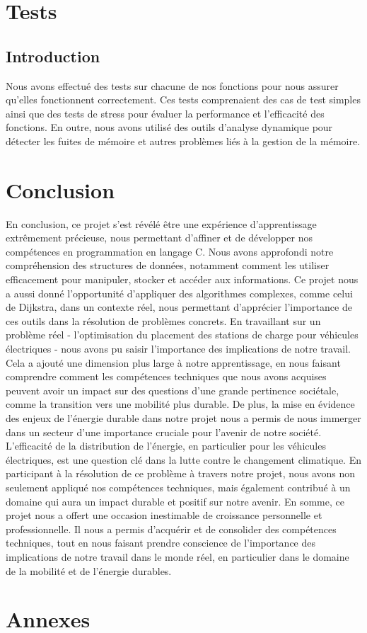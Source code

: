 \documentclass[french,a4paper]{article}
\begin{document}
\section{Tests}

\subsection{Introduction}
Nous avons effectué des tests sur chacune de nos fonctions pour nous assurer qu'elles fonctionnent correctement. Ces tests comprenaient des cas de test simples ainsi que des tests de stress pour évaluer la performance et l'efficacité des fonctions. En outre, nous avons utilisé des outils d'analyse dynamique pour détecter les fuites de mémoire et autres problèmes liés à la gestion de la mémoire.

\section{Conclusion}

En conclusion, ce projet s'est révélé être une expérience d'apprentissage extrêmement précieuse, nous permettant d'affiner et de développer nos compétences en programmation en langage C. Nous avons approfondi notre compréhension des structures de données, notamment comment les utiliser efficacement pour manipuler, stocker et accéder aux informations. Ce projet nous a aussi donné l'opportunité d'appliquer des algorithmes complexes, comme celui de Dijkstra, dans un contexte réel, nous permettant d'apprécier l'importance de ces outils dans la résolution de problèmes concrets.
\newline
En travaillant sur un problème réel - l'optimisation du placement des stations de charge pour véhicules électriques - nous avons pu saisir l'importance des implications de notre travail. Cela a ajouté une dimension plus large à notre apprentissage, en nous faisant comprendre comment les compétences techniques que nous avons acquises peuvent avoir un impact sur des questions d'une grande pertinence sociétale, comme la transition vers une mobilité plus durable.
\newline
De plus, la mise en évidence des enjeux de l'énergie durable dans notre projet nous a permis de nous immerger dans un secteur d'une importance cruciale pour l'avenir de notre société. L'efficacité de la distribution de l'énergie, en particulier pour les véhicules électriques, est une question clé dans la lutte contre le changement climatique. En participant à la résolution de ce problème à travers notre projet, nous avons non seulement appliqué nos compétences techniques, mais également contribué à un domaine qui aura un impact durable et positif sur notre avenir.
\newline
En somme, ce projet nous a offert une occasion inestimable de croissance personnelle et professionnelle. Il nous a permis d'acquérir et de consolider des compétences techniques, tout en nous faisant prendre conscience de l'importance des implications de notre travail dans le monde réel, en particulier dans le domaine de la mobilité et de l'énergie durables.

\section{Annexes}





\end{document}
